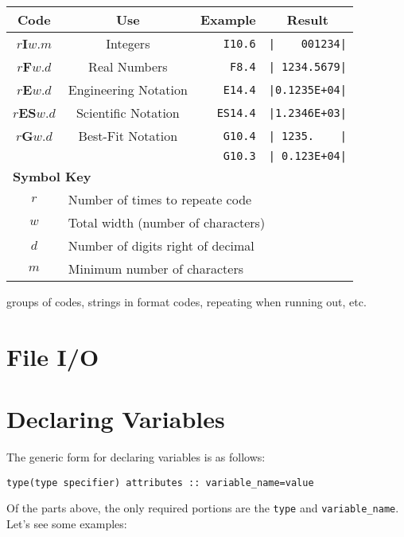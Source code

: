 \documentclass[11pt, letterpaper]{article}
\begin{document}
\begin{table}[!h]
  \begin{tabular}{|c|c|r|c|}
    \hline
    Code & Use & Example &  Result \\
    \hline
    $r$\textbf{I}$w.m$ & Integers             & \verb_I10.6_ & \verb_|    001234|_\\
    $r$\textbf{F}$w.d$ & Real Numbers         & \verb_F8.4_  & \verb_| 1234.5679|_\\
    $r$\textbf{E}$w.d$ & Engineering Notation & \verb_E14.4_ & \verb_|0.1235E+04|_\\
    $r$\textbf{ES}$w.d$& Scientific Notation  & \verb_ES14.4_& \verb_|1.2346E+03|_\\
    $r$\textbf{G}$w.d$ & Best-Fit Notation    & \verb_G10.4_ & \verb_| 1235.    |_\\
    &                      & \verb_G10.3_ & \verb_| 0.123E+04|_\\
    \hline
    \multicolumn{4}{|l|}{\textbf{Symbol Key}}\\
    \multicolumn{1}{|c}{$r$} & \multicolumn{3}{l|}{Number of times to repeate code}\\
    \multicolumn{1}{|c}{$w$} & \multicolumn{3}{l|}{Total width (number of characters)}\\
    \multicolumn{1}{|c}{$d$} & \multicolumn{3}{l|}{Number of digits right of decimal}\\ 
    \multicolumn{1}{|c}{$m$} & \multicolumn{3}{l|}{Minimum number of characters}\\
    \hline
    
  \end{tabular}
\end{table}

groups of codes, strings in format codes, repeating when running out, etc.


\section{File I/O}

\section{Declaring Variables}

The generic form for declaring variables is as follows:
\begin{verbatim}
type(type specifier) attributes :: variable_name=value
\end{verbatim}
Of the parts above, the only required portions are the \texttt{type} and
\texttt{variable\_name}.  Let's see some examples:
\end{document}
